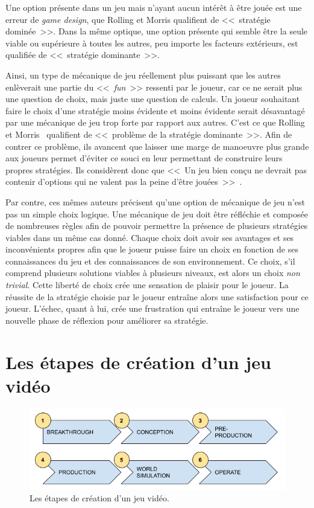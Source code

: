 Une option présente dans un jeu mais n'ayant aucun intérêt \`a être jouée est une erreur de \emph{game design}, que Rolling et Morris qualifient de <<~stratégie dominée~>>. 
Dans la même optique, une option présente qui semble être la seule viable ou supérieure à toutes les autres, peu importe les facteurs extérieurs, est qualifiée de <<~stratégie dominante~>>.

Ainsi, un type de mécanique de jeu réellement plus puissant que les autres enlèverait une partie du <<~\emph{fun}~>> ressenti par le joueur, car ce ne serait plus une question de choix, mais juste une question de calculs.
Un joueur souhaitant faire le choix d'une stratégie moins évidente et moins évidente serait désavantagé par une mécanique de jeu trop forte par rapport aux autres.
C'est ce que Rolling et Morris~\cite{Rollings2004} qualifient de <<~problème de la stratégie dominante~>>. 
Afin de contrer ce problème, ils avancent que laisser une marge de manoeuvre plus grande aux joueurs permet d'éviter ce souci en leur permettant de construire leurs propres stratégies.
Ils considèrent donc que <<~Un jeu bien conçu ne devrait pas contenir d'options qui ne valent pas la peine d'être jouées~>>~\cite{Rollings2004}.

Par contre, ces m\^emes auteurs précisent qu'une option de mécanique de jeu n'est pas un simple choix logique.
Une mécanique de jeu doit être réfléchie et composée de nombreuses règles afin de pouvoir permettre la présence de plusieurs stratégies viables dans un même cas donné.
%
Chaque choix doit avoir ses avantages et ses inconvénients propres afin que le joueur puisse faire un choix en fonction de ses connaissances du jeu et des connaissances de son environnement.
Ce choix, s'il comprend plusieurs solutions viables à plusieurs niveaux, est alors un choix \emph{non trivial}.
Cette liberté de choix crée une sensation de plaisir pour le joueur.
%
La réussite de la stratégie choisie par le joueur entraîne alors une satisfaction pour ce joueur.
L'échec, quant à lui, crée une frustration qui entraîne le joueur vers une nouvelle phase de réflexion pour améliorer sa stratégie.


\section{Les étapes de création d'un jeu vid\'eo}
\label{prob.etapes}
\begin{figure}[H]
    \centering
    \includegraphics[width=14cm]{10_img/production_stages.png} 
    \caption{Les étapes de création d'un jeu vidéo.}
    \label{fig.etapes}
\end{figure}

